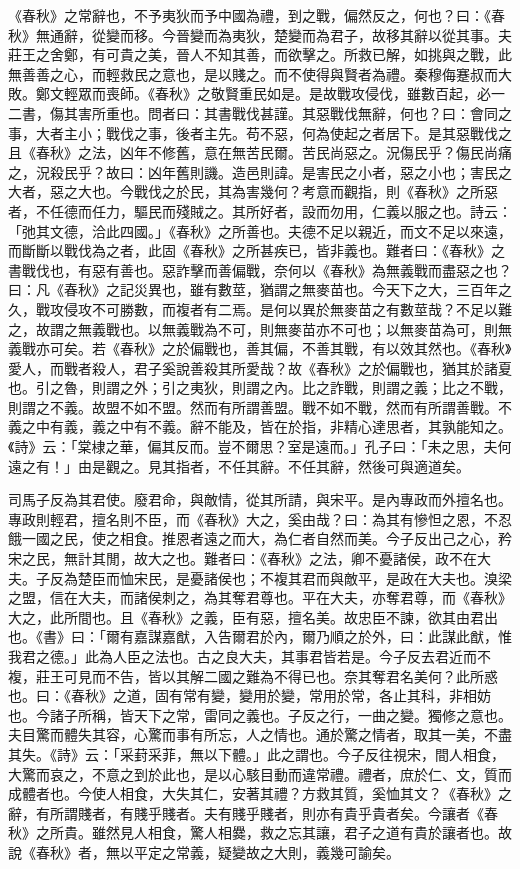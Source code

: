 《春秋》之常辭也，不予夷狄而予中國為禮，到之戰，偏然反之，何也？曰：《春秋》無通辭，從變而移。今晉變而為夷狄，楚變而為君子，故移其辭以從其事。夫莊王之舍鄭，有可貴之美，晉人不知其善，而欲擊之。所救已解，如挑與之戰，此無善善之心，而輕救民之意也，是以賤之。而不使得與賢者為禮。秦穆侮蹇叔而大敗。鄭文輕眾而喪師。《春秋》之敬賢重民如是。是故戰攻侵伐，雖數百起，必一二書，傷其害所重也。問者曰：其書戰伐甚謹。其惡戰伐無辭，何也？曰：會同之事，大者主小；戰伐之事，後者主先。苟不惡，何為使起之者居下。是其惡戰伐之且《春秋》之法，凶年不修舊，意在無苦民爾。苦民尚惡之。況傷民乎？傷民尚痛之，況殺民乎？故曰：凶年舊則譏。造邑則諱。是害民之小者，惡之小也；害民之大者，惡之大也。今戰伐之於民，其為害幾何？考意而觀指，則《春秋》之所惡者，不任德而任力，驅民而殘賊之。其所好者，設而勿用，仁義以服之也。詩云：「弛其文德，洽此四國。」《春秋》之所善也。夫德不足以親近，而文不足以來遠，而斷斷以戰伐為之者，此固《春秋》之所甚疾已，皆非義也。難者曰：《春秋》之書戰伐也，有惡有善也。惡詐擊而善偏戰，奈何以《春秋》為無義戰而盡惡之也？曰：凡《春秋》之記災異也，雖有數莖，猶謂之無麥苗也。今天下之大，三百年之久，戰攻侵攻不可勝數，而複者有二焉。是何以異於無麥苗之有數莖哉？不足以難之，故謂之無義戰也。以無義戰為不可，則無麥苗亦不可也；以無麥苗為可，則無義戰亦可矣。若《春秋》之於偏戰也，善其偏，不善其戰，有以效其然也。《春秋》愛人，而戰者殺人，君子奚說善殺其所愛哉？故《春秋》之於偏戰也，猶其於諸夏也。引之魯，則謂之外；引之夷狄，則謂之內。比之詐戰，則謂之義；比之不戰，則謂之不義。故盟不如不盟。然而有所謂善盟。戰不如不戰，然而有所謂善戰。不義之中有義，義之中有不義。辭不能及，皆在於指，非精心達思者，其孰能知之。《詩》云：「棠棣之華，偏其反而。豈不爾思？室是遠而。」孔子曰：「未之思，夫何遠之有！」由是觀之。見其指者，不任其辭。不任其辭，然後可與適道矣。



司馬子反為其君使。廢君命，與敵情，從其所請，與宋平。是內專政而外擅名也。專政則輕君，擅名則不臣，而《春秋》大之，奚由哉？曰：為其有慘怛之恩，不忍餓一國之民，使之相食。推恩者遠之而大，為仁者自然而美。今子反出己之心，矜宋之民，無計其閒，故大之也。難者曰：《春秋》之法，卿不憂諸侯，政不在大夫。子反為楚臣而恤宋民，是憂諸侯也；不複其君而與敵平，是政在大夫也。溴梁之盟，信在大夫，而諸侯刺之，為其奪君尊也。平在大夫，亦奪君尊，而《春秋》大之，此所間也。且《春秋》之義，臣有惡，擅名美。故忠臣不諫，欲其由君出也。《書》曰：「爾有嘉謀嘉猷，入告爾君於內，爾乃順之於外，曰：此謀此猷，惟我君之德。」此為人臣之法也。古之良大夫，其事君皆若是。今子反去君近而不複，莊王可見而不告，皆以其解二國之難為不得已也。奈其奪君名美何？此所惑也。曰：《春秋》之道，固有常有變，變用於變，常用於常，各止其科，非相妨也。今諸子所稱，皆天下之常，雷同之義也。子反之行，一曲之變。獨修之意也。夫目驚而體失其容，心驚而事有所忘，人之情也。通於驚之情者，取其一美，不盡其失。《詩》云：「采葑采菲，無以下體。」此之謂也。今子反往視宋，間人相食，大驚而哀之，不意之到於此也，是以心駭目動而違常禮。禮者，庶於仁、文，質而成體者也。今使人相食，大失其仁，安著其禮？方救其質，奚恤其文？《春秋》之辭，有所謂賤者，有賤乎賤者。夫有賤乎賤者，則亦有貴乎貴者矣。今讓者《春秋》之所貴。雖然見人相食，驚人相爨，救之忘其讓，君子之道有貴於讓者也。故說《春秋》者，無以平定之常義，疑變故之大則，義幾可諭矣。


